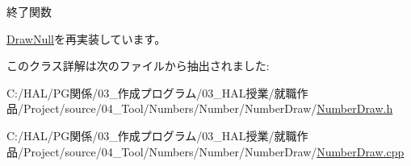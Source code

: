 終了関数 



\mbox{\hyperlink{class_draw_null_a12d44e341c7364b5ab9cdd661dc16187}{Draw\+Null}}を再実装しています。



このクラス詳解は次のファイルから抽出されました\+:\begin{DoxyCompactItemize}
\item 
C\+:/\+H\+A\+L/\+P\+G関係/03\+\_\+作成プログラム/03\+\_\+\+H\+A\+L授業/就職作品/\+Project/source/04\+\_\+\+Tool/\+Numbers/\+Number/\+Number\+Draw/\mbox{\hyperlink{_number_draw_8h}{Number\+Draw.\+h}}\item 
C\+:/\+H\+A\+L/\+P\+G関係/03\+\_\+作成プログラム/03\+\_\+\+H\+A\+L授業/就職作品/\+Project/source/04\+\_\+\+Tool/\+Numbers/\+Number/\+Number\+Draw/\mbox{\hyperlink{_number_draw_8cpp}{Number\+Draw.\+cpp}}\end{DoxyCompactItemize}

